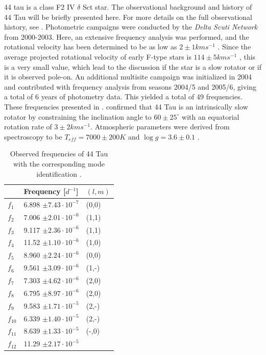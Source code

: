 44 tau is a class F2 IV $\delta$ Sct star. The observational background and history of 44 Tau will be briefly presented here. For more details on the full observational history, see \citet{antoci200744}. Photometric campaigns were conducted by the \textit{Delta Scuti Network} from 2000-2003. Here, an extensive frequency analysis was performed, and the rotational velocity has been determined to be as low as $2 \pm 1 km s^{-1}$ \citep{lenz2008asteroseismic}. Since the average projected rotational velocity of early F-type stars is $114 \pm 5 km s^{-1}$ \citep{royer2004rotational}, this is a very small value, which lead to the discussion if the star is a slow rotator or if it is observed pole-on\citep{antoci200744}. 
 An additional multisite campaign  was initialized in 2004 \citep{zima2007high} and \citet{breger2008A&A} contributed with frequency analysis from seasons  2004/5 and 2005/6, giving a total of 6 years of photometry data. This yielded a total of 49 frequencies. These frequencies presented in . \citet{zima2007high} confirmed that 44 Tau is an intrinsically slow rotator by constraining the inclination angle to $60 \pm 25^{\circ}$ with an equatorial rotation rate of $3 \pm 2 km s^{-1}$. Atmospheric parameters were derived from spectroscopy to be  $T_{eff} = 7000\pm200 K$ and $\log g = 3.6\pm0.1$ \citep{zima2007high}.

\begin{table}[htbp]
	\centering
	\caption{Observed frequencies of 44 Tau with the corresponding mode identification \citep{lenz2010delta}. }
	\label{freqs}
\begin{tabular}{lll}
\toprule
         & Frequency [$d^{-1}$]  & $(l,m)$ \\ \midrule
$f_1$  & 6.898 $ \pm 7.43 \cdot 10^{-7}$ & (0,0)    \\
$f_2$  & 7.006 $ \pm 2.01 \cdot 10^{-6}$ & (1,1)    \\
$f_3$  & 9.117   $ \pm 2.36 \cdot10^{-6}$ & (1,1)     \\
$f_4$  & 11.52   $ \pm 1.10 \cdot 10^{-6}$ &  (1,0) \\
$f_5$  & 8.960  $ \pm 2.24 \cdot 10^{-6}$ & (0,0)     \\
$f_6$  & 9.561   $ \pm  3.09\cdot 10^{-6}$ &  (1,-)  \\
$f_7$  & 7.303  $ \pm  4.62 \cdot 10^{-6}$ &  (2,0) \\
$f_8$  & 6.795  $ \pm  8.97 \cdot 10^{-6}$  &  (2,0)    \\
$f_9$  & 9.583 $ \pm 1.71\cdot 10^{-5}$ &  (2,-)   \\
$f_{10}$ & 6.339  $ \pm 1.40 \cdot 10^{-5} $& (2,-)    \\
$f_{11}$ & 8.639  $ \pm  1.33\cdot  10^{-5}$ &  (-,0)   \\
$f_{12}$ & 11.29 $ \pm     2.17\cdot 10^{-5} $ &    \\
             
\end{tabular}
\end{table}

